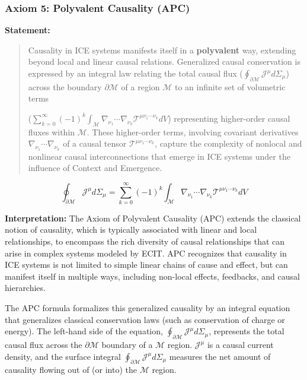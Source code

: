 \documentclass{article}
\begin{document}
\subsubsection{Axiom 5: Polyvalent Causality (APC)}
\textbf{Statement:}
\begin{quote}
    

Causality in ICE systems manifests itself in a \textbf{polyvalent} way, extending beyond local and linear causal relations. Generalized causal conservation is expressed by an integral law relating the total causal flux ($\oint_{\partial \mathcal{M}} \mathcal{J}^\mu d\Sigma_\mu$) across the boundary $\partial \mathcal{M}$ of a region $\mathcal{M}$ to an infinite set of volumetric terms \par
($\sum_{k=0}^\infty (-1)^k \int_{\mathcal{M}} \nabla_{\nu_1}\cdots\nabla_{\nu_k} \mathcal{T}^{\mu\nu_1\cdots\nu_k} dV$) representing higher-order causal fluxes within $\mathcal{M}$. These higher-order terms, involving covariant derivatives $\nabla_{\nu_1}\cdots\nabla_{\nu_k}$ of a causal tensor $\mathcal{T}^{\mu\nu_1\cdots\nu_k}$, capture the complexity of nonlocal and nonlinear causal interconnections that emerge in ICE systems under the influence of Context and Emergence.
\end{quote}

\begin{equation}
\oint_{\partial \mathcal{M}} \mathcal{J}^\mu d\Sigma_\mu = \sum_{k=0}^\infty (-1)^k \int_{\mathcal{M}} \nabla_{\nu_1}\cdots\nabla_{\nu_k} \mathcal{T}^{\mu\nu_1\cdots\nu_k} dV
\label{eq:APC_formula}
\end{equation}
\bigskip

\textbf{Interpretation:} The Axiom of Polyvalent Causality (APC) extends the classical notion of causality, which is typically associated with linear and local relationships, to encompass the rich diversity of causal relationships that can arise in complex systems modeled by ECIT. APC recognizes that causality in ICE systems is not limited to simple linear chains of cause and effect, but can manifest itself in multiple ways, including non-local effects, feedbacks, and causal hierarchies.

The APC formula formalizes this generalized causality by an integral equation that generalizes classical conservation laws (such as conservation of charge or energy). The left-hand side of the equation, $\oint_{\partial \mathcal{M}} \mathcal{J}^\mu d\Sigma_\mu$, represents the total causal flux across the $\partial \mathcal{M}$ boundary of a $\mathcal{M}$ region. $\mathcal{J}^\mu$ is a causal current density, and the surface integral $\oint_{\partial \mathcal{M}} \mathcal{J}^\mu d\Sigma_\mu$ measures the net amount of causality flowing out of (or into) the $\mathcal{M}$ region.
\end{document}
